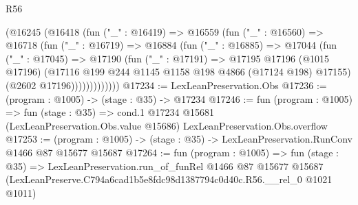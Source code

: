 \begin{lexlean}{R56}
\begin{coremodule}
            (@16245
              (@16418
                (fun ("_" : @16419) =>
                @16559
                  (fun ("_" : @16560) =>
                  @16718
                    (fun ("_" : @16719) =>
                    @16884
                      (fun ("_" : @16885) =>
                      @17044
                        (fun ("_" : @17045) =>
                        @17190
                          (fun ("_" : @17191) =>
                          @17195
                            @17196
                            (@1015 @17196)
                            (@17116 @199 @244 @1145 @1158 @198 @4866 (@17124 @198) @17155)
                            (@2602 @17196)))))))))))))
@17234 := LexLeanPreservation.Obs
@17236 := (program : @1005) -> (stage : @35) -> @17234
@17246 := fun (program : @1005) =>
  fun (stage : @35) =>
  cond.{1} @17234 @15681 (LexLeanPreservation.Obs.value @15686) LexLeanPreservation.Obs.overflow
@17253 := (program : @1005) -> (stage : @35) -> LexLeanPreservation.RunConv @1466 @87 @15677 @15687
@17264 := fun (program : @1005) =>
  fun (stage : @35) =>
  LexLeanPreservation.run_of_funRel
    @1466
    @87
    @15677
    @15687
    (LexLeanPreserve.C794a6cad1b5e8fdc98d1387794c0d40c.R56.__rel_0 @1021 @1011)
\end{coremodule}
\end{lexlean}
